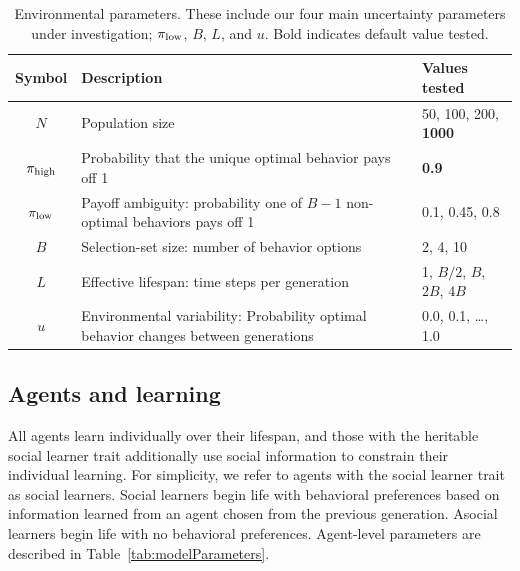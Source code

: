 \documentclass[letterpaper,11.5pt]{scrartcl}
\begin{document}
\vspace{2em}
\begin{table}[h]
\caption{Environmental parameters. These include our four main uncertainty parameters under investigation; 
$\pi_{\mathrm{low}}$, $B$, $L$, and $u$. Bold indicates default value tested.} %
    \label{tab:uncertaintyParameters}
    \centering %
    \begin{tabular}{cp{4.0in}p{1.25in}} \toprule

        Symbol & Description & Values tested \\ 

        \midrule  
        $N$    & Population size
                 & 50, 100, 200, \textbf{1000} \\
               

        $\pi_{\mathrm{high}}$ & Probability that the unique optimal behavior pays off 1 
                & \textbf{0.9} \\

        $\pi_{\mathrm{low}}$ & Payoff ambiguity: probability one of $B - 1$ non-optimal behaviors pays off 1
                 & 0.1, 0.45, 0.8 \\ 

        $B$       & Selection-set size: number of behavior options
                  & 2, 4, 10 \\
                  
        $L$    & Effective lifespan: time steps per generation & 1, $B/2$, $B$, $2B$, $4B$ \\
        
        $u$    & Environmental variability: Probability optimal behavior changes between generations
               & 0.0, 0.1, \ldots, 1.0 \\
               
        \bottomrule
        \end{tabular} 
\end{table}



\subsection{Agents and learning}

All agents learn individually over their lifespan, and those with
the heritable social learner trait additionally use social information to constrain their individual
learning. For simplicity, we refer to agents with the social learner trait 
as social learners. 
Social learners begin life with behavioral preferences based on information learned from an agent chosen from the previous generation. Asocial learners begin life with no behavioral preferences. Agent-level parameters are described in Table~\ref{tab:modelParameters}. 
\end{document}
